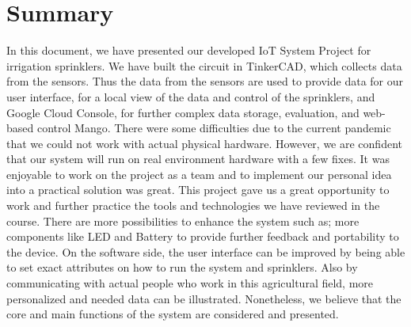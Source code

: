 \documentclass{article}
\begin{document}
\section{Summary}
In this document, we have presented our developed IoT System Project for irrigation sprinklers. We have built the circuit in TinkerCAD, which collects data from the sensors. Thus the data from the sensors are used to provide data for our user interface, for a local view of the data and control of the sprinklers, and Google Cloud Console, for further complex data storage, evaluation, and web-based control Mango. There were some difficulties due to the current pandemic that we could not work with actual physical hardware. However, we are confident that our system will run on real environment hardware with a few fixes. \newline
It was enjoyable to work on the project as a team and to implement our personal idea into a practical solution was great. This project gave us a great opportunity to work and further practice the tools and technologies we have reviewed in the course. There are more possibilities to enhance the system such as; more components like LED and Battery to provide further feedback and portability to the device. On the software side, the user interface can be improved by being able to set exact attributes on how to run the system and sprinklers. Also by communicating with actual people who work in this agricultural field, more personalized and needed data can be illustrated. Nonetheless, we believe that the core and main functions of the system are considered and presented.
\end{document}

